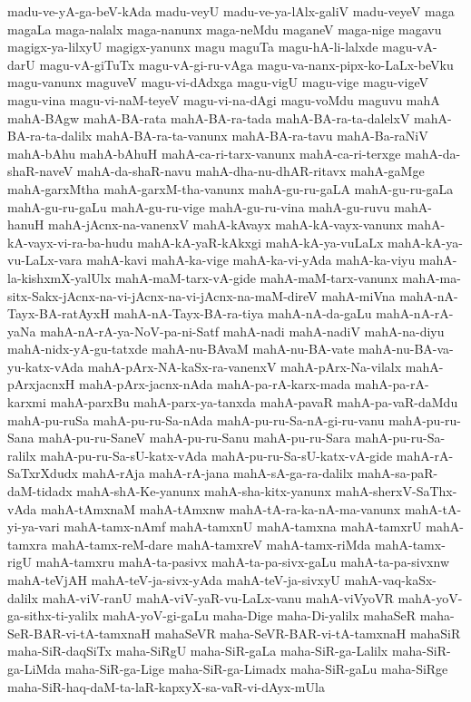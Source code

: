 {madu-ve-yA-ga-beV-kAda
madu-veyU
madu-ve-ya-lAlx-galiV
madu-veyeV
maga
magaLa
maga-nalalx
maga-nanunx
maga-neMdu
maganeV
maga-nige
magavu
magigx-ya-lilxyU
magigx-yanunx
magu
maguTa
magu-hA-li-lalxde
magu-vA-darU
magu-vA-giTuTx
magu-vA-gi-ru-vAga
magu-va-nanx-pipx-ko-LaLx-beVku
magu-vanunx
maguveV
magu-vi-dAdxga
magu-vigU
magu-vige
magu-vigeV
magu-vina
magu-vi-naM-teyeV
magu-vi-na-dAgi
magu-voMdu
maguvu
mahA
mahA-BAgw
mahA-BA-rata
mahA-BA-ra-tada
mahA-BA-ra-ta-dalelxV
mahA-BA-ra-ta-dalilx
mahA-BA-ra-ta-vanunx
mahA-BA-ra-tavu
mahA-Ba-raNiV
mahA-bAhu
mahA-bAhuH
mahA-ca-ri-tarx-vanunx
mahA-ca-ri-terxge
mahA-da-shaR-naveV
mahA-da-shaR-navu
mahA-dha-nu-dhAR-ritavx
mahA-gaMge
mahA-garxMtha
mahA-garxM-tha-vanunx
mahA-gu-ru-gaLA
mahA-gu-ru-gaLa
mahA-gu-ru-gaLu
mahA-gu-ru-vige
mahA-gu-ru-vina
mahA-gu-ruvu
mahA-hanuH
mahA-jAcnx-na-vanenxV
mahA-kAvayx
mahA-kA-vayx-vanunx
mahA-kA-vayx-vi-ra-ba-hudu
mahA-kA-yaR-kAkxgi
mahA-kA-ya-vuLaLx
mahA-kA-ya-vu-LaLx-vara
mahA-kavi
mahA-ka-vige
mahA-ka-vi-yAda
mahA-ka-viyu
mahA-la-kishxmX-yalUlx
mahA-maM-tarx-vA-gide
mahA-maM-tarx-vanunx
mahA-ma-sitx-Sakx-jAcnx-na-vi-jAcnx-na-vi-jAcnx-na-maM-direV
mahA-miVna
mahA-nA-Tayx-BA-ratAyxH
mahA-nA-Tayx-BA-ra-tiya
mahA-nA-da-gaLu
mahA-nA-rA-yaNa
mahA-nA-rA-ya-NoV-pa-ni-Satf
mahA-nadi
mahA-nadiV
mahA-na-diyu
mahA-nidx-yA-gu-tatxde
mahA-nu-BAvaM
mahA-nu-BA-vate
mahA-nu-BA-va-yu-katx-vAda
mahA-pArx-NA-kaSx-ra-vanenxV
mahA-pArx-Na-vilalx
mahA-pArxjacnxH
mahA-pArx-jacnx-nAda
mahA-pa-rA-karx-mada
mahA-pa-rA-karxmi
mahA-parxBu
mahA-parx-ya-tanxda
mahA-pavaR
mahA-pa-vaR-daMdu
mahA-pu-ruSa
mahA-pu-ru-Sa-nAda
mahA-pu-ru-Sa-nA-gi-ru-vanu
mahA-pu-ru-Sana
mahA-pu-ru-SaneV
mahA-pu-ru-Sanu
mahA-pu-ru-Sara
mahA-pu-ru-Sa-ralilx
mahA-pu-ru-Sa-sU-katx-vAda
mahA-pu-ru-Sa-sU-katx-vA-gide
mahA-rA-SaTxrXdudx
mahA-rAja
mahA-rA-jana
mahA-sA-ga-ra-dalilx
mahA-sa-paR-daM-tidadx
mahA-shA-Ke-yanunx
mahA-sha-kitx-yanunx
mahA-sherxV-SaThx-vAda
mahA-tAmxnaM
mahA-tAmxnw
mahA-tA-ra-ka-nA-ma-vanunx
mahA-tA-yi-ya-vari
mahA-tamx-nAmf
mahA-tamxnU
mahA-tamxna
mahA-tamxrU
mahA-tamxra
mahA-tamx-reM-dare
mahA-tamxreV
mahA-tamx-riMda
mahA-tamx-rigU
mahA-tamxru
mahA-ta-pasivx
mahA-ta-pa-sivx-gaLu
mahA-ta-pa-sivxnw
mahA-teVjAH
mahA-teV-ja-sivx-yAda
mahA-teV-ja-sivxyU
mahA-vaq-kaSx-dalilx
mahA-viV-ranU
mahA-viV-yaR-vu-LaLx-vanu
mahA-viVyoVR
mahA-yoV-ga-sithx-ti-yalilx
mahA-yoV-gi-gaLu
maha-Dige
maha-Di-yalilx
mahaSeR
maha-SeR-BAR-vi-tA-tamxnaH
mahaSeVR
maha-SeVR-BAR-vi-tA-tamxnaH
mahaSiR
maha-SiR-daqSiTx
maha-SiRgU
maha-SiR-gaLa
maha-SiR-ga-Lalilx
maha-SiR-ga-LiMda
maha-SiR-ga-Lige
maha-SiR-ga-Limadx
maha-SiR-gaLu
maha-SiRge
maha-SiR-haq-daM-ta-laR-kapxyX-sa-vaR-vi-dAyx-mUla
}
